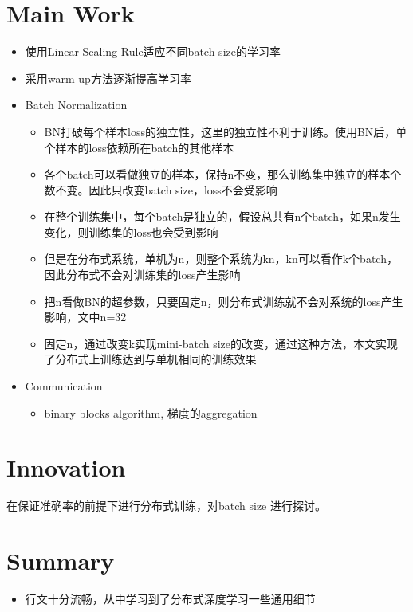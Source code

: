 \documentclass[11pt]{article}
\begin{document}
\section{Main Work}
\label{sec:org62bdd0b}
\begin{itemize}
\item 使用Linear Scaling Rule适应不同batch size的学习率
\item 采用warm-up方法逐渐提高学习率
\item Batch Normalization
\begin{itemize}
\item BN打破每个样本loss的独立性，这里的独立性不利于训练。使用BN后，单个样本的loss依赖所在batch的其他样本
\item 各个batch可以看做独立的样本，保持n不变，那么训练集中独立的样本个数不变。因此只改变batch size，loss不会受影响
\item 在整个训练集中，每个batch是独立的，假设总共有n个batch，如果n发生变化，则训练集的loss也会受到影响
\item 但是在分布式系统，单机为n，则整个系统为kn，kn可以看作k个batch，因此分布式不会对训练集的loss产生影响
\item 把n看做BN的超参数，只要固定n，则分布式训练就不会对系统的loss产生影响，文中n=32
\item 固定n，通过改变k实现mini-batch size的改变，通过这种方法，本文实现了分布式上训练达到与单机相同的训练效果
\end{itemize}
\item Communication
\begin{itemize}
\item binary blocks algorithm, 梯度的aggregation
\end{itemize}
\end{itemize}
\section{Innovation}
\label{sec:org4db980f}
在保证准确率的前提下进行分布式训练，对batch size 进行探讨。
\section{Summary}
\label{sec:org44f72ed}
\begin{itemize}
\item 行文十分流畅，从中学习到了分布式深度学习一些通用细节
\end{itemize}
\end{document}
